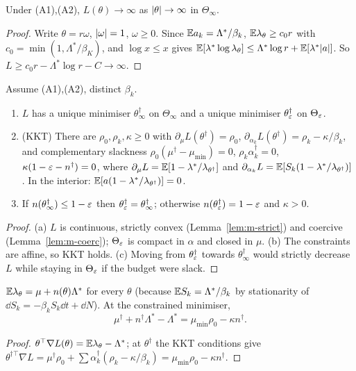 \begin{lemma}\label{lem:m-coerc}\Pt{}
Under (A1),(A2), $L(\theta)\to\infty$ as $\lvert \theta\rvert\to\infty$ in $\Theta_\infty$.
\end{lemma}
\begin{proof}
Write $\theta=r\omega$, $\lvert \omega\rvert=1$, $\omega\ge0$. Since $\mathbb{E} a_k=\Lambda^*/\beta_k$, $\mathbb{E}\lambda_\theta\ge c_0r$ with $c_0=\min(1,\Lambda^*/\beta_K)$, and $\log x\le x$ gives $\mathbb{E}[\lambda^*\log\lambda_\theta]\le\Lambda^*\log r+\mathbb{E}[\lambda^*\lvert a\rvert]$. So $L\ge c_0r-\Lambda^*\log r-C\to\infty$.
\end{proof}

\begin{theorem}\label{thm:m-exist}\Pt{}
Assume (A1),(A2), distinct $\beta_k$.
\begin{enumerate}[nosep,label=(\alph*)]
\item $L$ has a unique minimiser $\theta^\dagger_\infty$ on $\Theta_\infty$ and a unique minimiser $\theta^\dagger_\varepsilon$ on $\Theta_\varepsilon$.
\item (KKT) There are $\rho_0,\rho_k,\kappa\ge0$ with $\partial_\mu L(\theta^\dagger)=\rho_0$, $\partial_{\alpha_k}L(\theta^\dagger)=\rho_k-\kappa/\beta_k$, and complementary slackness $\rho_0(\mu^\dagger-\mu_{\min})=0$, $\rho_k\alpha^\dagger_k=0$, $\kappa(1-\varepsilon-n^\dagger)=0$, where $\partial_\mu L=\mathbb{E}[1-\lambda^*/\lambda_{\theta^\dagger}]$ and $\partial_{\alpha_k}L=\mathbb{E}[S_k(1-\lambda^*/\lambda_{\theta^\dagger})]$. In the interior: $\mathbb{E}[a(1-\lambda^*/\lambda_{\theta^\dagger})]=0$.
\item If $n(\theta^\dagger_\infty)\le1-\varepsilon$ then $\theta^\dagger_\varepsilon=\theta^\dagger_\infty$; otherwise $n(\theta^\dagger_\varepsilon)=1-\varepsilon$ and $\kappa>0$.
\end{enumerate}
\end{theorem}
\begin{proof}
(a) $L$ is continuous, strictly convex (Lemma~\ref{lem:m-strict}) and coercive (Lemma~\ref{lem:m-coerc}); $\Theta_\varepsilon$ is compact in $\alpha$ and closed in $\mu$. (b) The constraints are affine, so KKT holds. (c) Moving from $\theta^\dagger_\varepsilon$ towards $\theta^\dagger_\infty$ would strictly decrease $L$ while staying in $\Theta_\varepsilon$ if the budget were slack.
\end{proof}

\begin{proposition}\label{prop:m-rate}\Pt{}
$\mathbb{E}\lambda_\theta=\mu+n(\theta)\Lambda^*$ for every $\theta$ (because $\mathbb{E} S_k=\Lambda^*/\beta_k$ by stationarity of $\dd S_k=-\beta_kS_k\dd t+\dd N$). At the constrained minimiser,
\[
\mu^\dagger+n^\dagger\Lambda^*-\Lambda^*=\mu_{\min}\rho_0-\kappa n^\dagger .
\]
\end{proposition}
\begin{proof}
$\theta^{\top}\nabla L(\theta)=\mathbb{E}\lambda_\theta-\Lambda^*$; at $\theta^\dagger$ the KKT conditions give $\theta^{\dagger\top}\nabla L=\mu^\dagger\rho_0+\sum\alpha^\dagger_k(\rho_k-\kappa/\beta_k)=\mu_{\min}\rho_0-\kappa n^\dagger$.
\end{proof}

